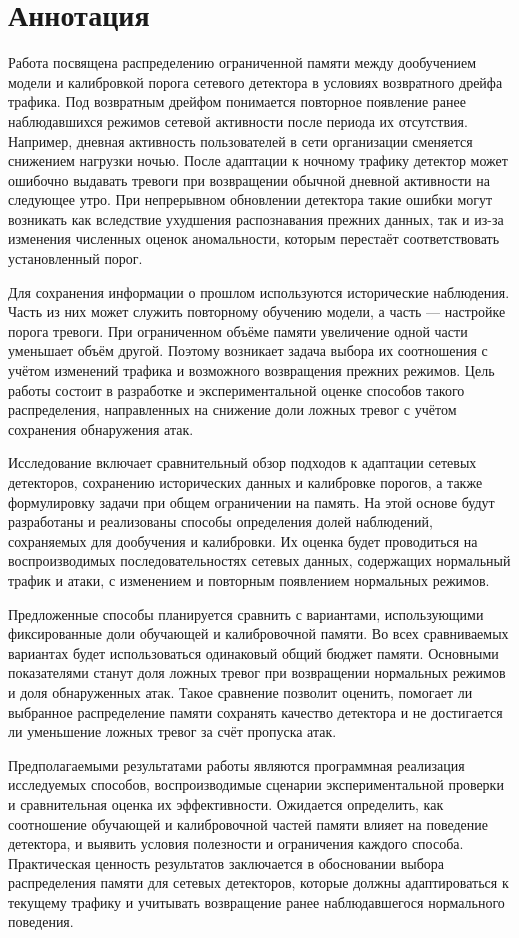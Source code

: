 \documentclass[12pt,a4paper]{article}
\def\abstractdocumentend{\end{document}}
\begin{document}
\fi

\section*{Аннотация}

Работа посвящена распределению ограниченной памяти между дообучением модели
и калибровкой порога сетевого детектора в условиях возвратного дрейфа трафика. Под возвратным дрейфом понимается повторное появление
ранее наблюдавшихся режимов сетевой активности после периода их отсутствия.
Например, дневная активность пользователей в сети организации
сменяется снижением нагрузки ночью. После адаптации к ночному
трафику детектор может ошибочно выдавать тревоги при возвращении
обычной дневной активности на следующее утро.
При непрерывном обновлении детектора такие ошибки могут возникать как
вследствие ухудшения распознавания прежних данных, так и из-за изменения
численных оценок аномальности, которым перестаёт соответствовать установленный
порог.

Для сохранения информации о прошлом используются исторические наблюдения.
Часть из них может служить повторному обучению модели, а часть --- настройке
порога тревоги. При ограниченном объёме памяти увеличение одной части
уменьшает объём другой. Поэтому возникает задача выбора
их соотношения с учётом изменений трафика и возможного возвращения прежних
режимов. Цель работы состоит в разработке и экспериментальной оценке способов
такого распределения, направленных на снижение доли ложных тревог с учётом
сохранения обнаружения атак.

Исследование включает сравнительный обзор подходов к адаптации сетевых
детекторов, сохранению исторических данных и калибровке порогов, а также
формулировку задачи при общем ограничении на память. На этой основе будут
разработаны и реализованы способы определения долей наблюдений, сохраняемых
для дообучения и калибровки. Их оценка будет проводиться на воспроизводимых
последовательностях сетевых данных, содержащих нормальный трафик и атаки,
с изменением и повторным появлением нормальных режимов.

Предложенные способы планируется сравнить с вариантами, использующими
фиксированные доли обучающей и калибровочной памяти. Во всех сравниваемых
вариантах будет использоваться одинаковый общий бюджет памяти. Основными
показателями станут доля ложных тревог при возвращении нормальных режимов
и доля обнаруженных атак. Такое сравнение позволит оценить, помогает ли
выбранное распределение памяти сохранять качество детектора и не достигается
ли уменьшение ложных тревог за счёт пропуска атак.

Предполагаемыми результатами работы являются программная реализация
исследуемых способов, воспроизводимые сценарии экспериментальной проверки
и сравнительная оценка их эффективности. Ожидается определить, как соотношение
обучающей и калибровочной частей памяти влияет на поведение детектора,
и выявить условия полезности и ограничения каждого способа. Практическая
ценность результатов заключается в обосновании выбора распределения памяти
для сетевых детекторов, которые должны адаптироваться к текущему трафику
и учитывать возвращение ранее наблюдавшегося нормального поведения.

\abstractdocumentend
\end{document}
